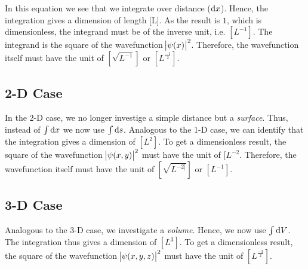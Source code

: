 In this equation we see that we integrate over distance ($\dif x$). Hence,
the integration gives a dimension of length [L]. As the result is $1$,
which is dimensionless, the integrand must be of the inverse
unit, i.e. $[L^{-1}]$. The integrand is the square of the wavefunction
$\abs{\psi(x)}^2$. Therefore, the wavefunction itself must have the unit of
$[\sqrt{L^{-1}}]$ or $[L^{\frac{-1}{2}}]$.

\subsection{2-D Case}
In the 2-D case, we no longer investige a simple distance but a \emph{surface}.
Thus, instead of $\int \dif x$ we now use $\int \dif s$. Analogous to the
1-D case, we can identify that the integration gives a dimension of $[L^2]$.
To get a dimensionless result, the square of the wavefunction
$\abs{\psi(x,y)}^2$ must have the unit of $[L^{-2}$. Therefore, the
wavefunction itself must have the unit of $[\sqrt{L^{-2]}}]$ or $[L^{-1}]$.

\subsection{3-D Case}
Analogous to the 3-D case, we investigate a \emph{volume}. Hence, we now
use $\int \dif V$. The integration thus gives a dimension of $[L^3]$. To
get a dimensionless result, the square of the wavefunction
$\abs{\psi(x,y,z)}^2$ must have the unit of $[L^{\frac{-3}{2}}]$.

